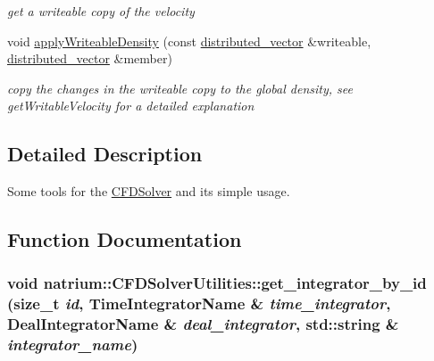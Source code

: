 \begin{DoxyCompactItemize}
\begin{DoxyCompactList}\small\item\em get a writeable copy of the velocity \item\end{DoxyCompactList}\item 
\hypertarget{namespacenatrium_1_1CFDSolverUtilities_ad28ce02271a0e87e460d6fb5c6a80f13}{
void \hyperlink{namespacenatrium_1_1CFDSolverUtilities_ad28ce02271a0e87e460d6fb5c6a80f13}{applyWriteableDensity} (const \hyperlink{namespacenatrium_a903d2b92917f582f2ff05f52160ab811}{distributed\_\-vector} \&writeable, \hyperlink{namespacenatrium_a903d2b92917f582f2ff05f52160ab811}{distributed\_\-vector} \&member)}
\label{namespacenatrium_1_1CFDSolverUtilities_ad28ce02271a0e87e460d6fb5c6a80f13}

\begin{DoxyCompactList}\small\item\em copy the changes in the writeable copy to the global density, see getWritableVelocity for a detailed explanation \item\end{DoxyCompactList}\end{DoxyCompactItemize}


\subsection{Detailed Description}
Some tools for the \hyperlink{classnatrium_1_1CFDSolver}{CFDSolver} and its simple usage. 

\subsection{Function Documentation}
\hypertarget{namespacenatrium_1_1CFDSolverUtilities_a3719826384e1c13644bac00524f72a46}{
\subsubsection[{get\_\-integrator\_\-by\_\-id}]{\setlength{\rightskip}{0pt plus 5cm}void natrium::CFDSolverUtilities::get\_\-integrator\_\-by\_\-id (size\_\-t {\em id}, \/  TimeIntegratorName \& {\em time\_\-integrator}, \/  DealIntegratorName \& {\em deal\_\-integrator}, \/  std::string \& {\em integrator\_\-name})}}
\label{namespacenatrium_1_1CFDSolverUtilities_a3719826384e1c13644bac00524f72a46}


